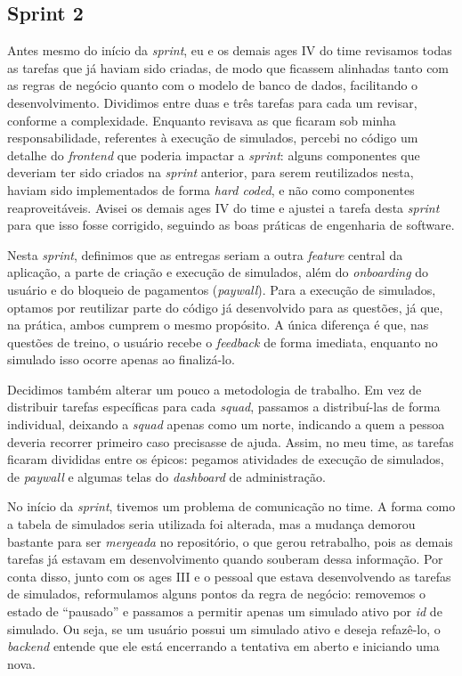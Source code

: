 \subsection{Sprint 2}

Antes mesmo do início da \textit{sprint}, eu e os demais \ac{ages} IV do time revisamos todas as tarefas que já haviam sido criadas, de modo que ficassem alinhadas tanto com as regras de negócio quanto com o modelo de banco de dados, facilitando o desenvolvimento. Dividimos entre duas e três tarefas para cada um revisar, conforme a complexidade. Enquanto revisava as que ficaram sob minha responsabilidade, referentes à execução de simulados, percebi no código um detalhe do \textit{frontend} que poderia impactar a \textit{sprint}: alguns componentes que deveriam ter sido criados na \textit{sprint} anterior, para serem reutilizados nesta, haviam sido implementados de forma \textit{hard coded}, e não como componentes reaproveitáveis. Avisei os demais \ac{ages} IV do time e ajustei a tarefa desta \textit{sprint} para que isso fosse corrigido, seguindo as boas práticas de engenharia de software.

Nesta \textit{sprint}, definimos que as entregas seriam a outra \textit{feature} central da aplicação, a parte de criação e execução de simulados, além do \textit{onboarding} do usuário e do bloqueio de pagamentos (\textit{paywall}). Para a execução de simulados, optamos por reutilizar parte do código já desenvolvido para as questões, já que, na prática, ambos cumprem o mesmo propósito. A única diferença é que, nas questões de treino, o usuário recebe o \textit{feedback} de forma imediata, enquanto no simulado isso ocorre apenas ao finalizá-lo.

Decidimos também alterar um pouco a metodologia de trabalho. Em vez de distribuir tarefas específicas para cada \textit{squad}, passamos a distribuí-las de forma individual, deixando a \textit{squad} apenas como um norte, indicando a quem a pessoa deveria recorrer primeiro caso precisasse de ajuda. Assim, no meu time, as tarefas ficaram divididas entre os épicos: pegamos atividades de execução de simulados, de \textit{paywall} e algumas telas do \textit{dashboard} de administração.

No início da \textit{sprint}, tivemos um problema de comunicação no time. A forma como a tabela de simulados seria utilizada foi alterada, mas a mudança demorou bastante para ser \textit{mergeada} no repositório, o que gerou retrabalho, pois as demais tarefas já estavam em desenvolvimento quando souberam dessa informação. Por conta disso, junto com os \ac{ages} III e o pessoal que estava desenvolvendo as tarefas de simulados, reformulamos alguns pontos da regra de negócio: removemos o estado de ``pausado'' e passamos a permitir apenas um simulado ativo por \textit{id} de simulado. Ou seja, se um usuário possui um simulado ativo e deseja refazê-lo, o \textit{backend} entende que ele está encerrando a tentativa em aberto e iniciando uma nova.

